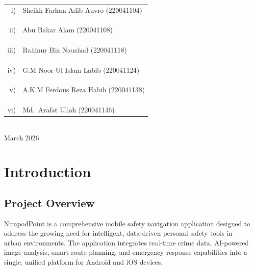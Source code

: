 \documentclass[12pt,a4paper]{report}
\begin{document}
\begin{titlepage}
    {\color{primaryblue}\normalsize
    \begin{tabular}{rl}
        i)   & Sheikh Farhan Adib Auvro \quad (220041104) \\\\
             & \\\\
        ii)  & Abu Bakar Alam \quad (220041108) \\\\
             & \\\\
        iii) & Rahinur Bin Naushad \quad (220041118) \\\\
             & \\\\
        iv)  & G.M Noor Ul Islam Labib \quad (220041124) \\\\
             & \\\\
        v)   & A.K.M Ferdous Reza Habib \quad (220041138) \\\\
             & \\\\
        vi)  & Md.\ Arafat Ullah \quad (220041146)
    \end{tabular}
    }\\[0.9cm]

    {\normalsize March 2026}

\end{titlepage}

\tableofcontents
\newpage

\chapter{Introduction}

\section{Project Overview}
NirapodPoint is a comprehensive mobile safety navigation application designed to address the growing need for intelligent, data-driven personal safety tools in urban environments. The application integrates real-time crime data, AI-powered image analysis, smart route planning, and emergency response capabilities into a single, unified platform for Android and iOS devices.
\end{document}

